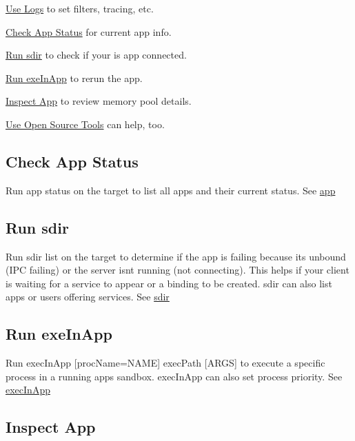 \begin{DoxyItemize}
\item \hyperlink{howToLogs}{Use Logs} to set filters, tracing, etc.
\item \hyperlink{how_to_debug_howToDebug_appStatus}{Check App Status} for current app info.
\item \hyperlink{how_to_debug_howToDebug_sdir}{Run sdir} to check if your is app connected.
\item \hyperlink{how_to_debug_howToDebug_execInApp}{Run exe\+In\+App} to rerun the app.
\item \hyperlink{how_to_debug_howToDebug_inspect}{Inspect App} to review memory pool details.
\item \hyperlink{how_to_debug_howToDebug_openTools}{Use Open Source Tools} can help, too.
\end{DoxyItemize}\hypertarget{how_to_debug_howToDebug_appStatus}{}\subsection{Check App Status}\label{how_to_debug_howToDebug_appStatus}
Run {\ttfamily app status} on the target to list all apps and their current status. See \hyperlink{toolsTarget_app}{app}\hypertarget{how_to_debug_howToDebug_sdir}{}\subsection{Run sdir}\label{how_to_debug_howToDebug_sdir}
Run {\ttfamily sdir list} on the target to determine if the app is failing because it\textquotesingle{}s unbound (I\+P\+C failing) or the server isn\textquotesingle{}t running (not connecting). This helps if your client is waiting for a service to appear or a binding to be created. {\ttfamily sdir} can also list apps or users offering services. See \hyperlink{toolsTarget_sdir}{sdir}\hypertarget{how_to_debug_howToDebug_execInApp}{}\subsection{Run exe\+In\+App}\label{how_to_debug_howToDebug_execInApp}
Run {\ttfamily  exec\+In\+App \mbox{[}proc\+Name=N\+A\+M\+E\mbox{]} exec\+Path \mbox{[}A\+R\+G\+S\mbox{]}} to execute a specific process in a running app\textquotesingle{}s sandbox. {\ttfamily exec\+In\+App} can also set process priority. See \hyperlink{toolsTarget_execInApp}{exec\+In\+App}\hypertarget{how_to_debug_howToDebug_inspect}{}\subsection{Inspect App}\label{how_to_debug_howToDebug_inspect}
